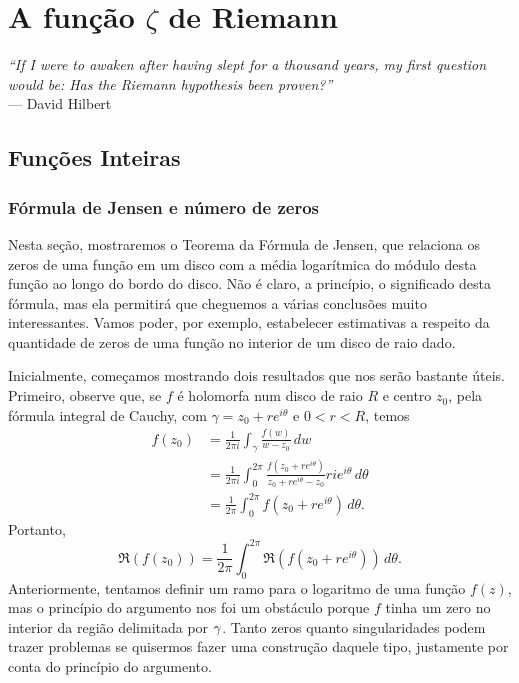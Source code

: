 \chapter{A função \texorpdfstring{$\zeta$}{zeta} de Riemann}
\chaptermark{}

\hfill%
\begin{minipage}{10cm}
    \begin{flushright}
    \rightskip=0.5cm
        \textit{%
            ``If I were to awaken after having slept for a thousand years, my first question would be: Has the Riemann hypothesis been proven?''
        }
        \\[0.1cm]
    \rightskip=0.5cm
    --- David Hilbert
    \end{flushright}
\end{minipage}

\section{Funções Inteiras}
    \subsection{Fórmula de Jensen e número de zeros}
    
    Nesta seção, mostraremos o Teorema da Fórmula de Jensen, que relaciona os zeros 
    de uma função em um disco com a média logarítmica do módulo desta função ao 
    longo do bordo do disco. Não é claro, a princípio, o significado desta fórmula,
    mas ela permitirá que cheguemos a várias conclusões muito interessantes. 
    Vamos poder, por exemplo, estabelecer estimativas a respeito da quantidade 
    de zeros de uma função no interior de um disco de raio dado.
    
    Inicialmente, começamos mostrando dois resultados que nos serão bastante úteis.
    Primeiro, observe que, se $f$ é holomorfa num disco de raio $R$ e centro $z_0$,
    pela fórmula integral de Cauchy, com $\gamma = z_0 + re^{i\theta}$ e $0 < r < R$,
    temos
    \begin{align*}
        f(z_0) &= \frac{1}{2\pi i}\int_\gamma \frac{f(w)}{w - z_0} \, dw \\
        &= \frac{1}{2\pi i} \int_{0}^{2\pi} \frac{f(z_0 + re^{i\theta})}{z_0 + re^{i\theta} - z_0} rie^{i\theta} \, d\theta \\
        &= \frac{1}{2\pi}\int_{0}^{2\pi}f(z_0 + re^{i\theta}) \, d\theta.
    \end{align*}
    Portanto,
    \begin{equation}
    \label{eq-representacao-int-re-f(z)}
        \Re(f(z_0)) 
        = \frac{1}{2\pi}\int_{0}^{2\pi}\Re(f(z_0 + re^{i\theta})) \, d\theta.
    \end{equation}
    Anteriormente, tentamos definir um ramo para o logaritmo de uma função $f(z)$, 
    mas o princípio do argumento nos foi um obstáculo porque $f$ tinha um zero 
    no interior da região delimitada por $\gamma$. Tanto zeros quanto singularidades 
    podem trazer problemas  se quisermos fazer uma construção daquele tipo, justamente
    por conta do princípio do argumento. 
    
